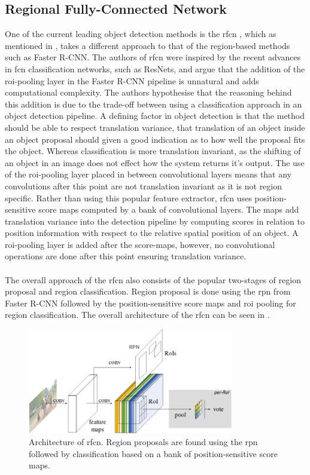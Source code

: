 \subsection{Regional Fully-Connected Network}
One of the current leading object detection methods is the \gls{rfcn} \cite{rfcn}, which as mentioned in , takes a different approach to that of the region-based methods such as Faster R-CNN. The authors of \gls{rfcn} were inspired by the recent advances in \gls{fcn} classification networks, such as ResNets, and argue that the addition of the \gls{roi}-pooling layer in the Faster R-CNN pipeline is unnatural and adds computational complexity. The authors hypothesise that the reasoning behind this addition is due to the trade-off between using a classification approach in an object detection pipeline. A defining factor in object detection is that the method should be able to respect translation variance, that translation of an object inside an object proposal should given a good indication as to how well the proposal fits the object. Whereas classification is more translation invariant, as the shifting of an object in an image does not effect how the system returns it's output. The use of the \gls{roi}-pooling layer placed in between convolutional layers means that any convolutions after this point are not translation invariant as it is not region specific. Rather than using this popular feature extractor, \gls{rfcn} uses position-sensitive score maps computed by a bank of convolutional layers. The maps add translation variance into the detection pipeline by computing scores in relation to position information with respect to the relative spatial position of an object. A \gls{roi}-pooling layer is added after the score-maps, however, no convolutional operations are done after this point ensuring translation variance.
\\\\
The overall approach of the \gls{rfcn} also consists of the popular two-stages of region proposal and region classification. Region proposal is done using the \gls{rpn} from Faster R-CNN followed by the position-sensitive score maps and \gls{roi} pooling for region classification. The overall architecture of the \gls{rfcn} can be seen in .


\begin{figure}[H]
  \centering
    \includegraphics[width=0.8\textwidth]{Figs/Techanal/rfcnarchi.png}
      \caption{Architecture of \gls{rfcn}. Region proposals are found using the \gls{rpn} followed by classification based on a bank of position-sensitive score maps.}
    \label{fig:rfcnarch}
\end{figure}

